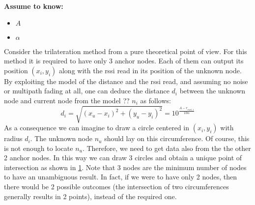 \documentclass[12pt,twoside]{report}
\begin{document}
  \begin{center}
  \textbf{Assume to know:}
  \begin{itemize}
    \centering
    \item $A$
    \item $\alpha$
  \end{itemize}
  \end{center}
Consider the trilateration method from a pure theoretical point of view. For this method it is required to have only 3 anchor nodes. Each of them can output its position $(x_i,y_i)$ along with the rssi read in its position of the unknown node. By exploiting the model of the distance and the rssi read, and assuming no noise or multipath fading at all, one can deduce the distance $d_i$ between the unknown node and current node from the model ?? $n_i$ as follows:  
\begin{equation}
    d_i=\sqrt{(x_u-x_i)^2+(y_u-y_i)^2}=10^{\frac{A-r_{rssi,i}}{10\alpha}}    
\end{equation}
As a consequence we can imagine to draw a circle centered in $(x_i,y_i)$ with radius $d_i$. The unknown node $n_u$ should lay on this circumference. Of course, this is not enough to locate $n_u$. Therefore, we need to get data also from the the other 2 anchor nodes. In this way we can draw 3 circles and obtain a unique point of intersection as shown in \ref{fig:trilOK}. Note that 3 nodes are the minimum number of nodes to have an unambiguous result. In fact, if we were to have only 2 nodes, then there would be 2 possible outcomes (the intersection of two circumferences generally results in 2 points), instead of the required one.
\begin{figure}
    \centering
    \caption{}
    \label{fig:trilOK}
\end{figure}
\end{document}
